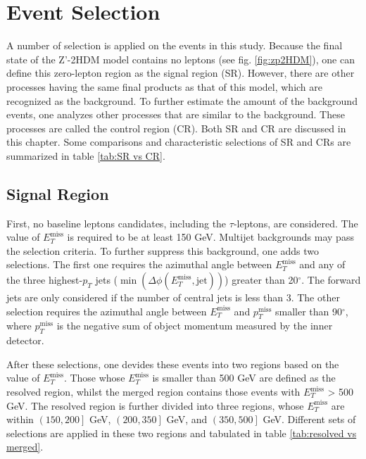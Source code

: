 \documentclass[class=NCU_thesis, crop=false]{standalone}
\begin{document}
\chapter{Event Selection}\label{Event selection}
	A number of selection is applied on the events in this study. Because the final state of the Z'-2HDM model contains no leptons (see fig. \ref{fig:zp2HDM}), one can define this zero-lepton region as the signal region (SR). However, there are other processes having the same final products as that of this model, which are recognized as the background. To further estimate the amount of the background events, one analyzes other processes that are similar to the background. These processes are called the control region (CR). Both SR and CR are discussed in this chapter. Some comparisons and characteristic selections of SR and CRs are summarized in table \ref{tab:SR vs CR}.

	\section{Signal Region}\label{SR}
		First, no baseline leptons candidates, including the $\tau$-leptons, are considered. The value of $E_T^{\mathrm{miss}}$ is required to be at least 150 GeV. Multijet backgrounds may pass the selection criteria. To further suppress this background, one adds two selections. The first one requires the azimuthal angle between $E_T^{\mathrm{miss}}$ and any of the three highest-$p_T$ jets ($\min(\Delta \phi(E_T^{\mathrm{miss}}, \mathrm{jet}))$) greater than 20$^\circ$. The forward jets are only considered if the number of central jets is less than 3. The other selection requires the azimuthal angle between $E_T^{\mathrm{miss}}$ and $p_T^{\mathrm{miss}}$ smaller than 90$^\circ$, where $p_T^{\mathrm{miss}}$ is the negative sum of object momentum measured by the inner detector.

		After these selections, one devides these events into two regions based on the value of $E_T^{\mathrm{miss}}$. Those whose $E_T^{\mathrm{miss}}$ is smaller than 500 GeV are defined as the resolved region, whilst the merged region contains those events with $E_T^{\mathrm{miss}}$ > 500 GeV. The resolved region is further divided into three regions, whose $E_T^{\mathrm{miss}}$ are within $\left(150, 200\right]$ GeV, $\left(200, 350\right]$ GeV, and $\left(350, 500\right]$ GeV. Different sets of selections are applied in these two regions and tabulated in table \ref{tab:resolved vs merged}.
\end{document}
